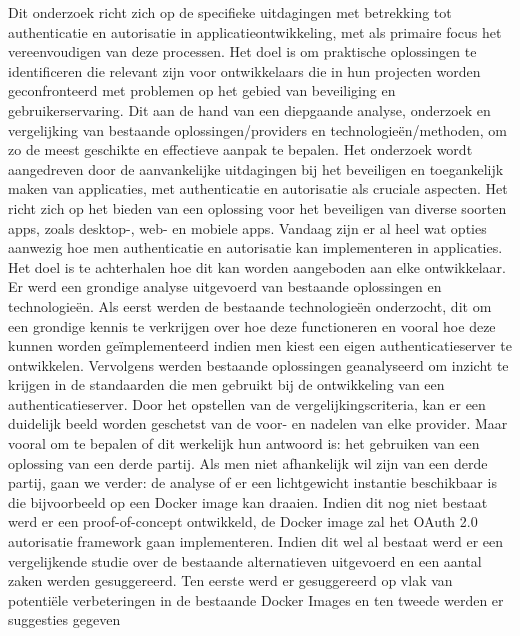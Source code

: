 Dit onderzoek richt zich op de specifieke uitdagingen met betrekking tot authenticatie en autorisatie in applicatieontwikkeling, met als primaire 
focus het vereenvoudigen van deze processen. Het doel is om praktische oplossingen te identificeren die relevant zijn voor ontwikkelaars 
die in hun projecten worden geconfronteerd met problemen op het gebied van beveiliging en gebruikerservaring. Dit aan de hand van een diepgaande analyse,
onderzoek en vergelijking van bestaande oplossingen/providers en technologieën/methoden, om zo de meest geschikte en effectieve aanpak te bepalen. 
\newline
\newline
Het onderzoek wordt aangedreven door de aanvankelijke uitdagingen bij het beveiligen en toegankelijk maken van applicaties, met authenticatie en 
autorisatie als cruciale aspecten. Het richt zich op het bieden van een oplossing voor het beveiligen van diverse soorten apps, zoals desktop-, 
web- en mobiele apps. Vandaag zijn er al heel wat opties aanwezig hoe men authenticatie en autorisatie kan implementeren in applicaties.
Het doel is te achterhalen hoe dit kan worden aangeboden aan elke ontwikkelaar.
\newline
\newline
Er werd een grondige analyse uitgevoerd van bestaande oplossingen en technologieën. Als eerst werden de bestaande technologieën onderzocht,
dit om een grondige kennis te verkrijgen over hoe deze functioneren en vooral hoe deze kunnen worden geïmplementeerd indien men kiest een eigen
authenticatieserver te ontwikkelen. Vervolgens werden bestaande oplossingen geanalyseerd om inzicht te krijgen in de standaarden die
men gebruikt bij de ontwikkeling van een authenticatieserver. 
Door het opstellen van de vergelijkingscriteria, kan er een duidelijk beeld worden geschetst van de voor- en nadelen van elke provider.
Maar vooral om te bepalen of dit werkelijk hun antwoord is: het gebruiken van een oplossing van een derde partij. Als men niet afhankelijk wil zijn van 
een derde partij, gaan we verder: de analyse of er een lichtgewicht instantie beschikbaar is die bijvoorbeeld op een Docker image kan draaien.
Indien dit nog niet bestaat werd er een proof-of-concept ontwikkeld, de Docker image zal het OAuth 2.0 autorisatie framework gaan implementeren.
Indien dit wel al bestaat werd er een vergelijkende studie over de bestaande alternatieven uitgevoerd en een aantal zaken werden gesuggereerd.
Ten eerste werd er gesuggereerd op vlak van potentiële verbeteringen in de bestaande Docker Images en ten tweede werden er suggesties gegeven

